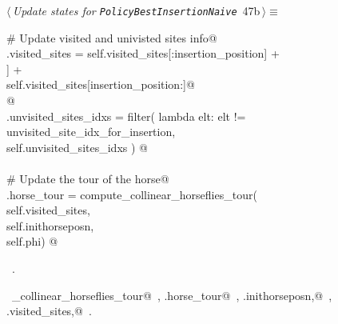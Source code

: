 \documentclass[11.5pt]{report}
\begin{document}
\vspace{-0.8cm}\newchunk 

\begin{flushleft} \small\label{scrap74}\raggedright\small
{} $\langle\,${\itshape Update states for \texttt{PolicyBestInsertionNaive}}\nobreak\ {\footnotesize {47b}}$\,\rangle\equiv$
\vspace{-1ex}
\begin{list}{}{} \item
\mbox{}\verb@# Update visited and univisted sites info@\\
\mbox{}\verb@self.visited_sites = self.visited_sites[:insertion_position]      +\@\\
\mbox{}\verb@                     [self.sites[unvisited_site_idx_for_insertion]] +\@\\
\mbox{}\verb@                     self.visited_sites[insertion_position:]@\\
\mbox{}\verb@  @\\
\mbox{}\verb@self.unvisited_sites_idxs = filter( lambda elt: elt != unvisited_site_idx_for_insertion, \@\\
\mbox{}\verb@                                    self.unvisited_sites_idxs ) @\\
\mbox{}\verb@@\\
\mbox{}\verb@# Update the tour of the horse@\\
\mbox{}\verb@self.horse_tour = compute_collinear_horseflies_tour(\@\\
\mbox{}\verb@                           self.visited_sites,         \@\\
\mbox{}\verb@                           self.inithorseposn, \@\\
\mbox{}\verb@                           self.phi) @\\
\mbox{}\verb@@{\NWsep}
\end{list}
\vspace{-1.5ex}
\footnotesize
\begin{list}{}{\setlength{\itemsep}{-\parsep}\setlength{\itemindent}{-\leftmargin}}
\item \NWtxtMacroRefIn\ .
\item \NWtxtIdentsUsed\nobreak\  \verb@compute_collinear_horseflies_tour@\nobreak\ , \verb@self.horse_tour@\nobreak\ , \verb@self.inithorseposn,@\nobreak\ , \verb@self.visited_sites,@\nobreak\ .
\item{}
\end{list}
\vspace{4ex}
\end{flushleft}
\newpage
\end{document}
